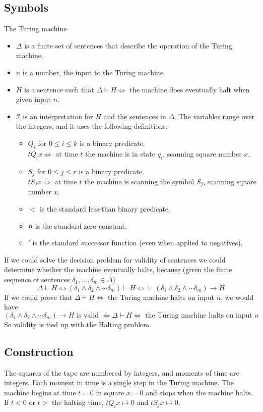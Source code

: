 \subsection{Symbols}
The Turing machine 

\begin{itemize}
\item $\Delta$ is a finite set of sentences that describe the operation of the Turing machine.
\item $n$ is a number, the input to the Turing machine.
\item $H$ is a sentence such that $\Delta\vdash H\iff$ the machine does eventually halt when given input $n$.
\item $\mathscr{I}$ is an interpretation for $H$ and the sentences in $\Delta$. The variables range over the integers, and it uses the following definitions:
\begin{itemize}
\renewcommand{\labelitemii}{\textopenbullet}
\item $Q_i$ for $0 \le i \le k$ is a binary predicate.\\
$t Q_i x \iff $ at time $t$ the machine is in state $q_i$, scanning square number $x$.
\item $S_j$ for $0\le j\le r$ is a binary predicate.\\
$t S_j x \iff $ at time $t$ the machine is scanning the symbol $S_j$, scanning square number $x$.
\item $<$ is the standard less-than binary predicate.
\item $\mathbf{o}$ is the standard zero constant.
\item $'$ is the standard successor function (even when applied to negatives).
\end{itemize}
\end{itemize}

If we could solve the decision problem for validity of sentences we could determine whether the machine eventually halts, because (given the finite sequence of sentences $\delta_1,\dots,\delta_m \in \Delta$)
\[\Delta\vdash H\iff (\delta_1\land \delta_2\land \cdots \delta_m)\vdash H \iff \vdash (\delta_1 \land  \delta_2 \land  \cdots\delta_m) \rightarrow H\]
If we could prove that $\Delta\vdash H \iff $ the Turing machine halts on input $n$, we would have
\[(\delta_1 \land  \delta_2 \land  \cdots\delta_m) \rightarrow H\text{ is valid }\iff \Delta\vdash H \iff \text{ the Turing machine halts on input }n\]
So validity is tied up with the Halting problem.

\subsection{Construction}
The squares of the tape are numbered by integers, and moments of time are integers. Each moment in time is a single step in the Turing machine. The machine begins at time $t=0$ in square $x=0$ and stops when the machine halts. If $t<0$ or $t>$ the halting time, $tQ_ix \mapsto 0$ and $tS_jx\mapsto 0$.

